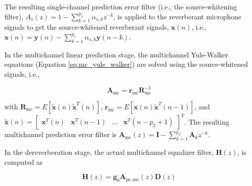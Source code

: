 The resulting single-channel prediction error filter (i.e., the source-whitening filter), $A_s(z)=1-\sum_{k=1}^{p_1}\alpha_{s,k}z^{-k}$, is applied to the reverberant microphone signals to get the source-whitened reverberant signals, $\boldsymbol{x}(n)$, i.e., $\boldsymbol{x}(n)=\boldsymbol{y}(n) - \sum_{k=1}^{p_1}\alpha_{s,k}\boldsymbol{y}(n-k)$.

In the multichannel linear prediction stage, the multichannel Yule-Walker equations (Equation \ref{eq:mc_yule_walker}) are solved using the source-whitened signals, i.e.,

\begin{equation}
	\boldsymbol{A}_{\mathrm{mc}} = \boldsymbol{r}_{\mathrm{mc}} \boldsymbol{R}_{\mathrm{mc}}^{-1} \label{eq:dap_mc_lp_yule_walker}
\end{equation}

\noindent
with $\boldsymbol{R}_{\mathrm{mc}} = E[\boldsymbol{\tilde{x}}(n) \boldsymbol{\tilde{x}}^T(n)]$, $\boldsymbol{r}_{\mathrm{mc}} = E[\boldsymbol{x}(n)\boldsymbol{\tilde{x}}^T(n-1)]$, and \newline $\boldsymbol{\tilde{x}}(n) = \begin{bmatrix} \boldsymbol{x}^T(n) &	\boldsymbol{x}^T(n-1)  & \dots  & \boldsymbol{x}^T(n-p_2+1) \end{bmatrix}^T$. The resulting multichannel prediction error filter is $\boldsymbol{A}_{\mathrm{mc}}(z) = \boldsymbol{I} - \sum_{k=1}^{p_2} \boldsymbol{A}_k z^{-k}$.


In the dereverberation stage, the actual multichannel equalizer filter, $\boldsymbol{H}(z)$, is computed as 

\begin{equation}
	\boldsymbol{H}(z) = \boldsymbol{g}_0 \boldsymbol{A}_{\mathrm{pe,mc}}(z) \boldsymbol{D}(z)
\end{equation}

